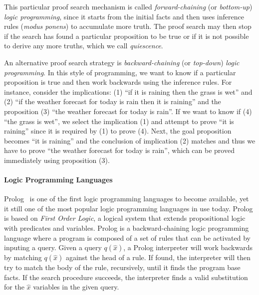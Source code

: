 This particular proof search mechanism is called \emph{forward-chaining} (or
\emph{bottom-up}) \emph{logic programming}, since it starts from the initial
facts and then uses inference rules (\emph{modus ponens}) to accumulate more
truth. The proof search may then stop if the search has found a particular
proposition to be true or if it is not possible to derive any more truths, which
we call \emph{quiescence}.

An alternative proof search strategy is \emph{backward-chaining} (or
\emph{top-down}) \emph{logic programming}. In this style of programming, we want
to know if a particular proposition is true and then work backwards using the
inference rules. For instance, consider the implications: (1) ``if it is raining
then the grass is wet'' and (2) ``if the weather forecast for today is rain then
it is raining'' and the proposition (3) ``the weather forecast for today is
rain''. If we want to know if (4) ``the grass is wet'', we select the
implication (1) and attempt to prove ``it is raining'' since it is required by
(1) to prove (4). Next, the goal proposition becomes ``it
is raining'' and the conclusion of implication (2) matches and thus we have to
prove ``the weather forecast for today is rain'', which can be proved
immediately using proposition (3).

\paragraph{Logic Programming Languages}

Prolog~\cite{Colmerauer:1993:BP:154766.155362} is one of the first logic
programming languages to become available, yet it still one of the most popular
logic programming languages in use today. Prolog is based on \emph{First Order
Logic}, a logical system that extends propositional logic with predicates and
variables. Prolog is a backward-chaining logic programming language where a
program is composed of a set of rules that can be activated by inputing a query.
Given a query $q(\hat{x})$, a Prolog interpreter will work backwards by matching
$q(\hat{x})$ against the head of a rule. If found, the interpreter will then try
to match the body of the rule, recursively, until it finds the program base
facts. If the search procedure succeeds, the interpreter finds a valid
substitution for the $\hat{x}$ variables in the given query.

